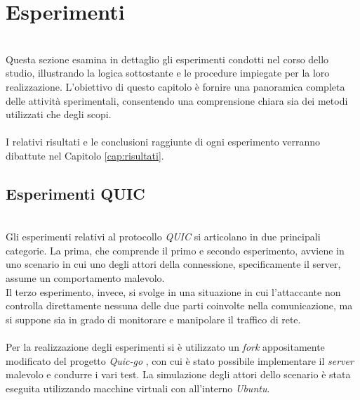 \section{Esperimenti}
~\\
\indent Questa sezione esamina in dettaglio gli esperimenti condotti nel corso dello studio, illustrando la logica sottostante e le procedure impiegate per la loro realizzazione. 
L'obiettivo di questo capitolo è fornire una panoramica completa delle attività sperimentali, consentendo una comprensione chiara sia dei metodi utilizzati che degli scopi.
\\\\
\noindent I relativi risultati e le conclusioni raggiunte di ogni esperimento verranno dibattute nel Capitolo \ref{cap:risultati}.

\subsection{Esperimenti QUIC}
~\\ 
\indent Gli esperimenti relativi al protocollo \emph{QUIC} si articolano in due principali categorie. 
La prima, che comprende il primo e secondo esperimento, avviene in uno scenario in cui uno degli attori della connessione, specificamente il server, assume un comportamento malevolo.
\\
Il terzo esperimento, invece, si svolge in una situazione in cui l'attaccante non controlla direttamente nessuna delle due parti coinvolte nella comunicazione, ma si suppone sia in grado di monitorare e manipolare il traffico di rete.
\\\\
Per la realizzazione degli esperimenti si è utilizzato un \emph{fork} appositamente modificato del progetto \emph{Quic-go} \cite{site:my-fork}, 
con cui è stato possibile implementare il \emph{server} malevolo e condurre i vari test.
La simulazione degli attori dello scenario è stata eseguita utilizzando macchine virtuali con all'interno \emph{Ubuntu}.

